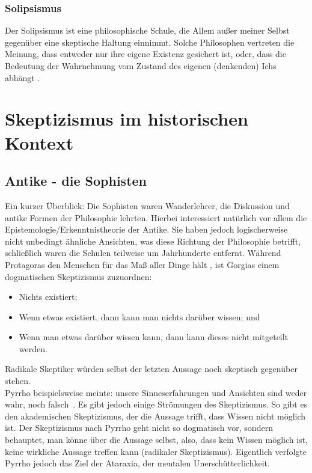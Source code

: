 \documentclass[12pt,a4paper]{article}
\begin{document}
		\subsubsection{Solipsismus}
Der Solipsismus ist eine philosophische Schule, die Allem außer meiner Selbst gegenüber eine skeptische Haltung einnimmt. Solche Philosophen vertreten die Meinung, dass entweder nur ihre eigene Existenz gesichert ist, oder, dass die Bedeutung der Wahrnehmung vom Zustand des eigenen (denkenden) Ichs abhängt \cite{iep_solipsis}.%
\section{Skeptizismus im historischen Kontext}
	\subsection{Antike - die Sophisten} %
Ein kurzer Überblick: Die Sophisten waren Wanderlehrer, die Diskussion und antike Formen der Philosophie lehrten. Hierbei interessiert natürlich vor allem die Epistemologie\slash Erkenntnistheorie der Antike. Sie haben jedoch logischerweise nicht unbedingt ähnliche Ansichten, was diese Richtung der Philosophie betrifft, schließlich waren die Schulen teilweise um Jahrhunderte entfernt. Während Protagoras den Menschen für das Maß aller Dinge hält \cite{enc_brit_sophist}%
, ist Gorgias einem dogmatischen Skeptizismus zuzuordnen:
\begin{itemize}
\item Nichts existiert;
\item Wenn etwas existiert, dann kann man nichts darüber wissen; und
\item Wenn man etwas darüber wissen kann, dann kann dieses nicht mitgeteilt werden. \cite{iep_on-the-nonex} 
\end{itemize}
Radikale Skeptiker würden selbst der letzten Aussage noch skeptisch gegenüber stehen.\\
Pyrrho beispielsweise meinte: \glqq unsere Sinneserfahrungen und Ansichten sind weder wahr, noch falsch\grqq\ \cite{greek_stough}.
Es gibt jedoch einige Strömungen des Skeptizismus. So gibt es den akademischen Skeptizismus, der die Aussage trifft, dass Wissen nicht möglich ist. Der Skeptizismus nach Pyrrho geht nicht so dogmatisch vor, sondern behauptet, man könne über die Aussage selbst, also, dass kein Wissen möglich ist, keine wirkliche Aussage treffen kann (radikaler Skeptizismus). %
Eigentlich verfolgte Pyrrho jedoch das Ziel der Ataraxia, der mentalen Unerschütterlichkeit.
\end{document}

